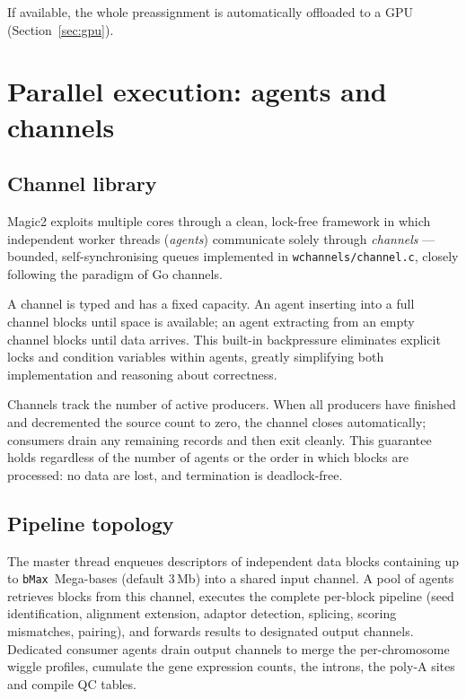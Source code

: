 \documentclass[11pt]{article}
\begin{document}
If available, the whole preassignment is automatically offloaded
to a GPU
(Section~\ref{sec:gpu}).

\section{Parallel execution: agents and channels}
\label{sec:parallel}

\subsection{Channel library}
\label{sec:channels}

Magic2 exploits multiple cores through a clean, lock-free framework
in which independent worker threads (\emph{agents}) communicate solely
through \emph{channels} --- bounded, self-synchronising queues implemented
in \texttt{wchannels/channel.c}, closely following the paradigm of
Go channels.

A channel is typed and has a fixed capacity.
An agent inserting into a full channel blocks until space is available;
an agent extracting from an empty channel blocks until data arrives.
This built-in backpressure eliminates explicit locks and condition
variables within agents, greatly simplifying both implementation and
reasoning about correctness.

Channels track the number of active producers.
When all producers have finished and decremented the source count to
zero, the channel closes automatically; consumers drain any remaining
records and then exit cleanly.
This guarantee holds regardless of the number of agents or the order
in which blocks are processed: no data are lost, and termination is
deadlock-free.

\subsection{Pipeline topology}
\label{sec:topology}

The master thread enqueues descriptors of independent data blocks
containing up to \texttt{bMax}\ Mega-bases (default 3\,Mb) into a shared input
channel.
A pool of agents retrieves blocks from this channel, executes the
complete per-block pipeline (seed identification, alignment extension,
adaptor detection, splicing, scoring mismatches, pairing), and forwards results to
designated output channels.
Dedicated consumer agents drain output channels to merge the per-chromosome
wiggle profiles, cumulate the gene expression counts, the introns, the poly-A sites
and compile QC tables.
\end{document}
